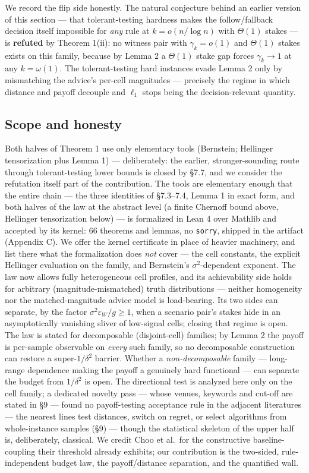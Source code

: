 We record the flip side honestly. The natural conjecture behind an
earlier version of this section --- that tolerant-testing hardness makes
the follow/fallback decision itself impossible for \emph{any} rule at
\(k = o(n/\log n)\) with \(\Theta(1)\) stakes --- is \textbf{refuted} by
Theorem 1(ii): no witness pair with \(\gamma_k = o(1)\) and
\(\Theta(1)\) stakes exists on this family, because by Lemma 2 a
\(\Theta(1)\) stake gap forces \(\gamma_k \to 1\) at any
\(k=\omega(1)\). The tolerant-testing hard instances evade Lemma 2 only
by mismatching the advice's per-cell magnitudes --- precisely the regime
in which distance and payoff decouple and \(\ell_1\) stops being the
decision-relevant quantity.

\subsection{Scope and honesty}

Both halves of Theorem 1 use only elementary tools (Bernstein; Hellinger
tensorization plus Lemma 1) --- deliberately: the earlier,
stronger-sounding route through tolerant-testing lower bounds is closed
by §7.7, and we consider the refutation itself part of the contribution.
The tools are elementary enough that the entire chain --- the three
identities of §7.3--7.4, Lemma 1 in exact form, and both halves of the
law at the abstract level (a finite Chernoff bound above, Hellinger
tensorization below) --- is formalized in Lean 4 over Mathlib and
accepted by its kernel: 66 theorems and lemmas, no \texttt{sorry},
shipped in the artifact (Appendix C). We offer the kernel certificate in
place of heavier machinery, and list there what the formalization does
\emph{not} cover --- the cell constants, the explicit Hellinger
evaluation on the family, and Bernstein's \(\sigma^2\)-dependent
exponent. The law now allows fully heterogeneous cell profiles, and its
achievability side holds for arbitrary (magnitude-mismatched) truth
distributions --- neither homogeneity nor the matched-magnitude advice
model is load-bearing. Its two sides can separate, by the factor
\(\sigma^2\varepsilon_W/g \ge 1\), when a scenario pair's stakes hide in
an asymptotically vanishing sliver of low-signal cells; closing that
regime is open. The law is stated for decomposable (disjoint-cell)
families; by Lemma 2 the payoff is per-sample observable on \emph{every}
such family, so no decomposable construction can restore a
super-\(1/\delta^2\) barrier. Whether a \emph{non-decomposable} family
--- long-range dependence making the payoff a genuinely hard functional
--- can separate the budget from \(1/\delta^2\) is open. The directional
test is analyzed here only on the cell family; a dedicated novelty pass
--- whose venues, keywords and cut-off are stated in §9 --- found no
payoff-testing acceptance rule in the adjacent literatures --- the
nearest lines test distances, switch on regret, or select algorithms
from whole-instance samples (§9) --- though the statistical skeleton of
the upper half is, deliberately, classical. We credit Choo et al.~for
the constructive baseline-coupling their threshold already exhibits; our
contribution is the two-sided, rule-independent budget law, the
payoff/distance separation, and the quantified wall.

